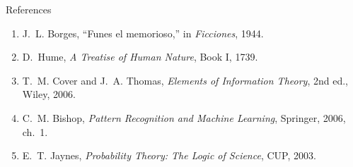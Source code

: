 \documentclass[aspectratio=169,11pt]{beamer}
\renewcommand{\AINITshorttitle}{Two engines}
\begin{document}
\appendix
\renewcommand{\AINITshorttitle}{Two engines \textemdash{} references}
\begin{frame}{References}
  \footnotesize
  \begin{enumerate}
    \item J.~L. Borges, ``Funes el memorioso,'' in \textit{Ficciones}, 1944.
    \item D.~Hume, \textit{A Treatise of Human Nature}, Book I, 1739.
    \item T.~M. Cover and J.~A. Thomas, \textit{Elements of Information Theory}, 2nd ed., Wiley, 2006.
    \item C.~M. Bishop, \textit{Pattern Recognition and Machine Learning}, Springer, 2006, ch.~1.
    \item E.~T. Jaynes, \textit{Probability Theory: The Logic of Science}, CUP, 2003.
  \end{enumerate}
\end{frame}
\end{document}
